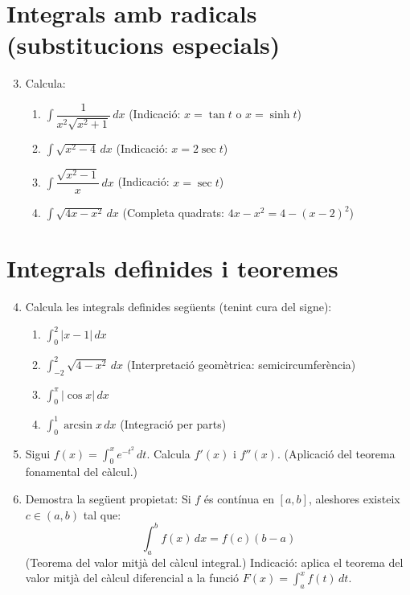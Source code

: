 \documentclass[12pt]{article}
\begin{document}
\section*{Integrals amb radicals (substitucions especials)}

\begin{enumerate}[label=\arabic*.]
    \setcounter{enumi}{2}
    \item Calcula:
    \begin{enumerate}[label=\alph*)]
        \item $\displaystyle \int \dfrac{1}{x^2\sqrt{x^2+1}}\,dx$ \quad (Indicació: $x=\tan t$ o $x=\sinh t$)
        \item $\displaystyle \int \sqrt{x^2-4}\,dx$ \quad (Indicació: $x=2\sec t$)
        \item $\displaystyle \int \dfrac{\sqrt{x^2-1}}{x}\,dx$ \quad (Indicació: $x=\sec t$)
        \item $\displaystyle \int \sqrt{4x-x^2}\,dx$ \quad (Completa quadrats: $4x-x^2 = 4-(x-2)^2$)
    \end{enumerate}
\end{enumerate}

\section*{Integrals definides i teoremes}

\begin{enumerate}[label=\arabic*.]
    \setcounter{enumi}{3}
    \item Calcula les integrals definides següents (tenint cura del signe):
    \begin{enumerate}[label=\alph*)]
        \item $\displaystyle \int_0^2 |x-1|\,dx$
        \item $\displaystyle \int_{-2}^2 \sqrt{4-x^2}\,dx$ \quad (Interpretació geomètrica: semicircumferència)
        \item $\displaystyle \int_0^{\pi} |\cos x|\,dx$
        \item $\displaystyle \int_0^1 \arcsin x\,dx$ \quad (Integració per parts)
    \end{enumerate}

    \item Sigui $f(x) = \displaystyle \int_0^x e^{-t^2}\,dt$. Calcula $f'(x)$ i $f''(x)$. (Aplicació del teorema fonamental del càlcul.)

    \item Demostra la següent propietat: Si $f$ és contínua en $[a,b]$, aleshores existeix $c \in (a,b)$ tal que:
    \[
    \int_a^b f(x)\,dx = f(c)(b-a)
    \]
    (Teorema del valor mitjà del càlcul integral.) Indicació: aplica el teorema del valor mitjà del càlcul diferencial a la funció $F(x)=\int_a^x f(t)\,dt$.
\end{enumerate}
\end{document}
